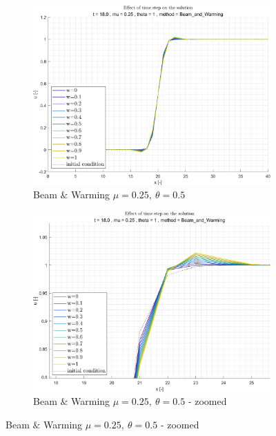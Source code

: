 \documentclass[11pt, a4paper]{article}
\begin{document}
\begin{figure}[H]
\begin{subfigure}[c]{.38\textwidth}
        \label{fig:Beam_&_Warming_general_mu0.001_theta0.5_B_diff_w}
    \end{subfigure}
    \begin{subfigure}[c]{.38\textwidth}
        \centering
        \includegraphics[width=\textwidth]{images/grap18.png}
        \caption{Beam $\&$ Warming $\mu=0.25,\ \theta=0.5$}
        \label{fig:Beam & Warming_general_mu0.25_theta1_A_diff_w}
    \end{subfigure}
    \begin{subfigure}[c]{.38\textwidth}
        \centering
        \includegraphics[width=\textwidth]{images/grap18.1.png}
        \caption{Beam $\&$ Warming $\mu=0.25,\ \theta=0.5$ - zoomed}
        \label{fig:Beam & Warming_general_mu0.25_theta1_B_diff_w}

\end{subfigure}
\end{figure}
\end{document}
